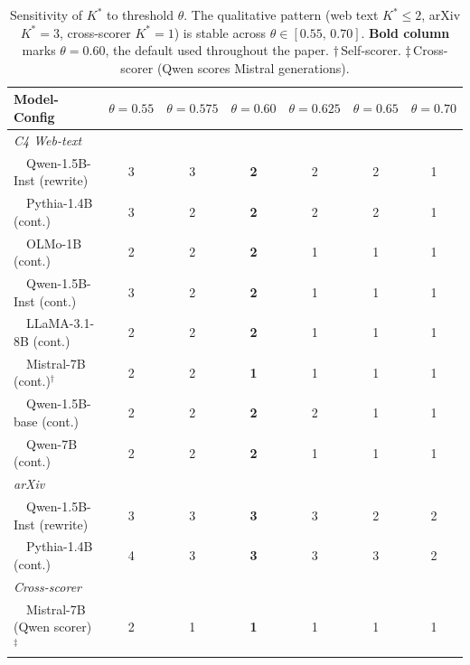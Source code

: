 \begin{table}[t]
\centering
\small
\setlength{\tabcolsep}{4pt}
\caption{Sensitivity of $K^*$ to threshold $\theta$. The qualitative pattern (web text $K^*\!\leq\!2$, arXiv $K^*\!=\!3$, cross-scorer $K^*\!=\!1$) is stable across $\theta\in[0.55,\,0.70]$. \textbf{Bold column} marks $\theta=0.60$, the default used throughout the paper. $\dagger$\,Self-scorer. $\ddagger$\,Cross-scorer (Qwen scores Mistral generations).}
\label{tab:theta_sensitivity}
\begin{tabular}{l c c c c c c}
\toprule
Model-Config & $\theta=0.55$ & $\theta=0.575$ & \textbf{$\theta=0.60$} & $\theta=0.625$ & $\theta=0.65$ & $\theta=0.70$ \\
\midrule
\multicolumn{7}{l}{\textit{C4 Web-text}} \\
~~Qwen-1.5B-Inst (rewrite) & 3 & 3 & \textbf{2} & 2 & 2 & 1 \\
~~Pythia-1.4B (cont.) & 3 & 2 & \textbf{2} & 2 & 2 & 1 \\
~~OLMo-1B (cont.) & 2 & 2 & \textbf{2} & 1 & 1 & 1 \\
~~Qwen-1.5B-Inst (cont.) & 3 & 2 & \textbf{2} & 1 & 1 & 1 \\
~~LLaMA-3.1-8B (cont.) & 2 & 2 & \textbf{2} & 1 & 1 & 1 \\
~~Mistral-7B (cont.)$^\dagger$ & 2 & 2 & \textbf{1} & 1 & 1 & 1 \\
~~Qwen-1.5B-base (cont.) & 2 & 2 & \textbf{2} & 2 & 1 & 1 \\
~~Qwen-7B (cont.) & 2 & 2 & \textbf{2} & 1 & 1 & 1 \\
\midrule
\multicolumn{7}{l}{\textit{arXiv}} \\
~~Qwen-1.5B-Inst (rewrite) & 3 & 3 & \textbf{3} & 3 & 2 & 2 \\
~~Pythia-1.4B (cont.) & 4 & 3 & \textbf{3} & 3 & 3 & 2 \\
\midrule
\multicolumn{7}{l}{\textit{Cross-scorer}} \\
~~Mistral-7B (Qwen scorer)$^\ddagger$ & 2 & 1 & \textbf{1} & 1 & 1 & 1 \\
\bottomrule
\end{tabular}
\end{table}